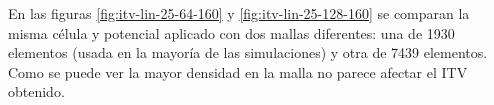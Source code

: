\documentclass[a4paper,10pt]{article}
\begin{document}
En las figuras \ref{fig:itv-lin-25-64-160} y \ref{fig:itv-lin-25-128-160} se comparan la misma célula y potencial aplicado con dos mallas diferentes: una de 1930 elementos (usada en la mayoría de las simulaciones) y otra de 7439 elementos.  Como se puede ver la mayor densidad en la malla no parece afectar el ITV obtenido.

\clearpage

%
%

%		

%



%		
\end{document}

